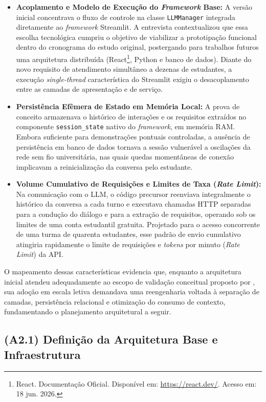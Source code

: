 \begin{itemize}
    \item \textbf{Acoplamento e Modelo de Execução do \textit{Framework} Base:} A versão inicial concentrava o fluxo de controle na classe \texttt{LLMManager} integrada diretamente ao \textit{framework} Streamlit. A entrevista contextualizou que essa escolha tecnológica cumpriu o objetivo de viabilizar a prototipação funcional dentro do cronograma do estudo original, postergando para trabalhos futuros uma arquitetura distribuída (React\footnote{React. Documentação Oficial. Disponível em: \url{https://react.dev/}. Acesso em: 18 jun. 2026.}, Python e banco de dados). Diante do novo requisito de atendimento simultâneo a dezenas de estudantes, a execução \textit{single-thread} característica do Streamlit exigiu o desacoplamento entre as camadas de apresentação e de serviço.
    \item \textbf{Persistência Efêmera de Estado em Memória Local:} A prova de conceito armazenava o histórico de interações e os requisitos extraídos no componente \texttt{session\_\allowbreak state} nativo do \textit{framework}, em memória RAM. Embora suficiente para demonstrações pontuais controladas, a ausência de persistência em banco de dados tornava a sessão vulnerável a oscilações da rede sem fio universitária, nas quais quedas momentâneas de conexão implicavam a reinicialização da conversa pelo estudante.
    \item \textbf{Volume Cumulativo de Requisições e Limites de Taxa (\textit{Rate Limit}):} Na comunicação com o LLM, o código precursor reenviava integralmente o histórico da conversa a cada turno e executava chamadas HTTP separadas para a condução do diálogo e para a extração de requisitos, operando sob os limites de uma conta estudantil gratuita. Projetado para o acesso concorrente de uma turma de quarenta estudantes, esse padrão de envio cumulativo atingiria rapidamente o limite de requisições e \textit{tokens} por minuto (\textit{Rate Limit}) da API.
\end{itemize}

O mapeamento dessas características evidencia que, enquanto a arquitetura inicial atendeu adequadamente ao escopo de validação conceitual proposto por , sua adoção em escala letiva demandava uma reengenharia voltada à separação de camadas, persistência relacional e otimização do consumo de contexto, fundamentando o planejamento arquitetural a seguir.

\subsection{(A2.1) Definição da Arquitetura Base e Infraestrutura}

